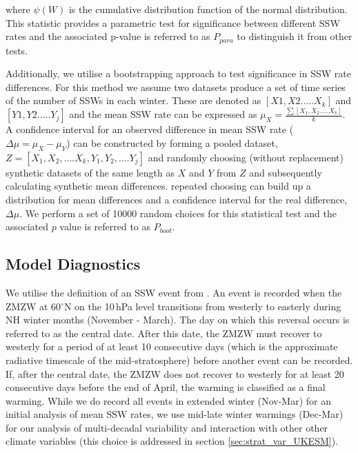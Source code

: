 where $\psi(W)$ is the cumulative distribution function of the normal distribution. This statistic provides a parametric test for significance between different SSW rates and the associated p-value is referred to as $P_{para}$ to distinguish it from other tests. 

Additionally, we utilise a bootstrapping approach to test significance in SSW rate differences. For this method we assume two datasets produce a set of time series of the number of SSWs in each winter. These are denoted as $[X1,X2.....X_k]$ and $[Y1,Y2.....Y_j]$ and the mean SSW rate can be expressed as $\mu_X = \frac{\sum[X_1,X_2.....X_k]}{k}$. A confidence interval for an observed difference in mean SSW rate ($\Delta\mu = \mu_X - \mu_Y$) can be constructed by forming a pooled dataset, $Z = [X_1, X_2,....X_k,Y_1,Y_2,....Y_j]$ and randomly choosing (without replacement) synthetic datasets of the same length as $X$ and $Y$ from $Z$ and subsequently calculating synthetic mean differences. repeated choosing can build up a distribution for mean differences and a confidence interval for the real difference, $\Delta\mu$. We perform a set of 10000 random choices for this statistical test and the associated $p$ value is referred to as $P_{boot}$.


\subsection{Model Diagnostics}
\label{sec:model_diagnostics}
We utilise the definition of an SSW event from \cite{butlerDefining2015b}. An event is recorded when the ZMZW at 60$^\circ$N on the 10\,hPa level transitions from westerly to easterly during NH winter months (November - March). The day on which this reversal occurs is referred to as the central date. After this date, the ZMZW must recover to westerly for a period of at least 10 consecutive days (which is the approximate radiative timescale of the mid-stratosphere) before another event can be recorded.  If, after the central date, the ZMZW does not recover to westerly for at least 20 consecutive days before the end of April, the warming is classified as a final warming. While we do record all events in extended winter (Nov-Mar) for an initial analysis of mean SSW rates, we use mid-late winter warmings (Dec-Mar) for our analysis of multi-decadal variability and interaction with other other climate variables (this choice is addressed in section \ref{sec:strat_var_UKESM}). 

